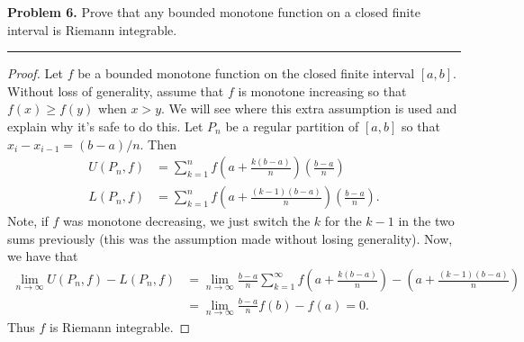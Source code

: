 \documentclass[leqno]{article}
\theoremstyle{nonumberplain}
\newtheorem{proof}{Proof}
\begin{document}
\pagebreak



\noindent\textbf{Problem 6.} \quad
Prove that any bounded monotone function on a closed finite interval is Riemann integrable.

\noindent\rule[0.5ex]{\linewidth}{1pt}

\begin{proof}
Let $f$ be a bounded monotone function on the closed finite interval $[a,b]$.  Without loss of generality, assume that $f$ is monotone increasing so that $f(x)\geq f(y)$ when $x>y$. We will see where this extra assumption is used and explain why it's safe to do this.   Let $P_n$ be a regular partition of $[a,b]$ so that $x_i-x_{i-1}=(b-a)/n$.  Then
\begin{align*}
U(P_n,f)&= \sum_{k=1}^n f\left(a+\frac{k(b-a)}{n}\right) \left( \frac{b-a}{n} \right) \\
L(P_n,f)&=\sum_{k=1}^n f\left(a+\frac{(k-1)(b-a)}{n} \right) \left( \frac{b-a}{n} \right).
\end{align*}
Note, if $f$ was monotone decreasing, we just switch the $k$ for the $k-1$ in the two sums previously (this was the assumption made without losing generality).  Now, we have that
\begin{align*}
\lim_{n\to \infty} U(P_n,f)-L(P_n,f)&= \lim_{n\to \infty}\frac{b-a}{n} \sum_{k=1}^\infty f \left( a+\frac{k(b-a)}{n} \right) - \left( a + \frac{(k-1)(b-a)}{n} \right)\\
&=\lim_{n\to \infty}\frac{b-a}{n}f(b)-f(a)=0.
\end{align*}
Thus $f$ is Riemann integrable.
\end{proof}

\pagebreak
\end{document}
